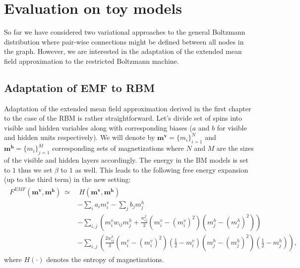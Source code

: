 
\chapter{Evaluation on toy models}
So far we have considered two variational approaches to the general Boltzmann distribution where pair-wise connections might be defined between all nodes in the graph. However, we are interested in the adaptation of the extended mean field approximation to the restricted Boltzmann machine.

\section{Adaptation of EMF to RBM}
Adaptation of the extended mean field approximation derived in the first chapter to the case of the RBM is rather straightforward. Let's divide set of spins into visible  and hidden variables along with corresponding biases ($a$ and $b$ for visible and hidden units respectively). We will denote by $\mathbf{m}^\mathbf{v} = \{m_i \}_{i=1}^N$ and $\mathbf{m}^\mathbf{h} = \{m_i \}_{j=1}^M$ corresponding sets of magnetizations where $N$ and $M$ are the sizes of the visible and hidden layers accordingly. The energy in the BM models is set to $1$ thus we set $\beta$ to $1$ as well. This leads to the following free energy expansion (up to the third term) in the new setting:
\begin{align}
\begin{split}
F^{EMF}(\mathbf{m^v},\mathbf{m^h}) ~\simeq & ~H(\mathbf{m^v}, \mathbf{m^h}) \\
&  - \sum_i a_i m_i^v - \sum_j b_j m_j^h \\
 & - \sum_{i,j} \left( 
 m_i^v w_{ij} m_j^h +  \frac{w_{ij}^2}{2}(m_i^v - (m_i^v)^2)(m_j^h - (m_j^h)^2) 
  \right) \\
    &  - \sum_{i,j} \left( 
 \frac{2w_{ij}^3}{3}(m_i^v - (m_i^v)^2)(\frac{1}{2} - m_i^v)(m_j^h - (m_j^h)^2)(\frac{1}{2} - m_j^h)  \right), 
\label{eq:expansionRBM}
\end{split}
\end{align}
where $H(\cdot)$ denotes the entropy of magnetizations.
